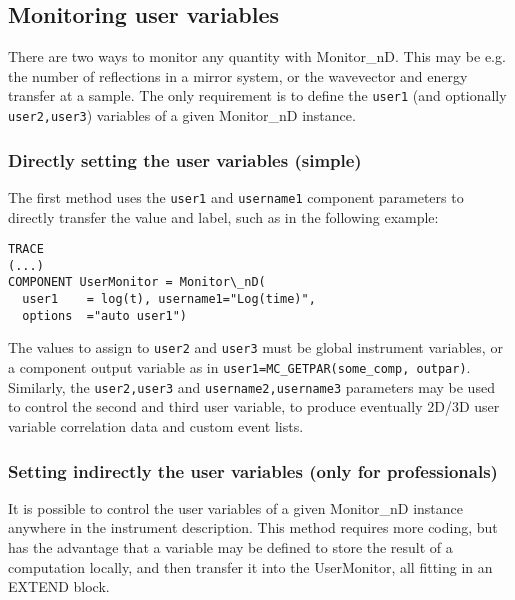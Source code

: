 \subsection{Monitoring user variables}
\label{s:monnd:user}

There are two ways to monitor any quantity with Monitor\_nD. This may be e.g.
the number of reflections in a mirror system, or the wavevector and energy
transfer at a sample. The only requirement is to define the \verb+user1+ (and
optionally \verb+user2,user3+) variables of a given Monitor\_nD instance.

\subsubsection{Directly setting the user variables (simple)}

The first method uses the \verb+user1+ and \verb+username1+ component parameters to directly transfer the value and label, such as in the following example:
\begin{lstlisting}
TRACE
(...)
COMPONENT UserMonitor = Monitor\_nD(
  user1    = log(t), username1="Log(time)",
  options  ="auto user1")
\end{lstlisting}
The values to assign to \verb+user2+ and \verb+user3+ must be global instrument variables, or a component output variable as in \verb+user1=MC_GETPAR(some_comp, outpar)+.
Similarly, the \verb+user2,user3+ and \verb+username2,username3+ parameters may be used to control the second and third user variable, to produce eventually 2D/3D user variable correlation data and custom event lists.

\subsubsection{Setting indirectly the user variables (only for professionals)}

It is possible to control the user variables of a given Monitor\_nD instance
anywhere in the instrument description. This method requires more coding, but
has the advantage that a variable may be defined to store the result of a
computation locally, and then transfer it into the UserMonitor, all fitting in
an EXTEND block.

